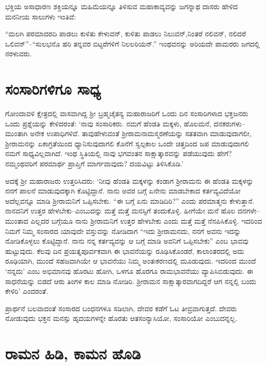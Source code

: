 ಭಕ್ತಿಯ ಅಸಾಧಾರಣ ಶಕ್ತಿಯನ್ನೂ ಮಹಿಮೆಯನ್ನೂ ತಿಳಿಸುವ ಮಹಾಕಾವ್ಯವನ್ನು ಜಗನ್ನಾಥ ದಾಸರು ಹೇಳಿದ ಮನನೀಯ ಸಾಲುಗಳು ಇಂತಿವೆ:

“ಮಲಗಿ ಪರಮಾದರದಿ ಪಾಡಲು ಕುಳಿತು ಕೇಳುವನ್, ಕುಳಿತು ಪಾಡಲು ನಿಲುವನ್,\break ನಿಂತರೆ ನಲಿವನ್, ನಲಿದರೆ ಒಲಿವನ್​”–“ಸುಲಭನೊ ಹರಿ ತನ್ನವರ ಬಿಟ್ಟರೆಗಳಿಗೆ ನಿಲಲರಿಯನ್.” ಇಂಥವನನ್ನು ಅರಿಯದೇ ಪಾಮರರು ಜಗದಲ್ಲಿ ನರಳುವರು.


\section*{ಸಂಸಾರಿಗಳಿಗೂ ಸಾಧ್ಯ}


ಗೋಂದಾವಳಿ ಕ್ಷೇತ್ರದಲ್ಲಿ ವಾಸವಾಗಿದ್ದ ಶ‍್ರೀ ಬ್ರಹ್ಮಚೈತನ್ಯ ಮಹಾರಾಜರಿಗೆ ಒಂದು ದಿನ ಸಂಸಾರಿಗಳಾದ ಭಕ್ತಜನರು ಒಂದು ಪ್ರಶ್ನೆಯನ್ನು ಕೇಳಿದರಂತೆ: ‘ನಾವು ಸಂಸಾರಿಕರು. ನಮಗೆ ಹೆಂಡತಿ ಮಕ್ಕಳು, ಹೊಲಮನೆ, ದನಕರುಗಳು–ಮುಂತಾಗಿ ಅನೇಕ ಉಪಾಧಿಗಳಿವೆ. ತಾವು\break ಹೇಳುವಂತೆ ಶ‍್ರೀರಾಮನಾಮಸ್ಮರಣೆಯನ್ನು ಸತತವಾಗಿ ಮಾಡುವು\-ದಾಗಲೀ, ಶ‍್ರೀರಾಮನನ್ನು ಏಕಾಗ್ರತೆಯಿಂದ ಧ್ಯಾನಿಸುವುದಾಗಲಿ ಕೊನೆಗೆ ಸ್ವಲ್ಪಕಾಲ ಒಂದೇ ಚಿತ್ತದಿಂದ ಜಪ ಮಾಡುವುದಾಗಲಿ ನಮಗೆ ಸಾಧ್ಯವಿಲ್ಲವಾಗಿದೆ. ಇಂಥ ಸ್ಥಿತಿಯಲ್ಲಿ ನಾವು ಭಗವಂತನ ಸಾಕ್ಷಾತ್ಕಾರವನ್ನು ಪಡೆಯುವುದು ಹೇಗೆ? ನಮ್ಮಂಥವರಿಗೆ ಪರಮಾರ್ಥ ಪ್ರಾಪ್ತಿಗೆ ಮಾರ್ಗವಾವುದು? ದಯವಿಟ್ಟು ತಿಳಿಸಿಕೊಡಿ.’

ಅದಕ್ಕೆ ಶ‍್ರೀ ಮಹಾರಾಜರು ಉತ್ತರಿಸಿದರು: ‘ನೀವು ಹೆಂಡತಿ ಮಕ್ಕಳನ್ನು ಕಂಡಾಗ ಶ‍್ರೀರಾಮನು ಈ ಹೆಂಡತಿ ಮಕ್ಕಳನ್ನು ನನಗೆ ಪಾಲನೆ ಮಾಡುವುದಕ್ಕಾಗಿ ಕೊಟ್ಟಿದ್ದಾನೆ. ನಾನು ಅವರ ಬಗ್ಗೆ ಏನೇನು ಮಾಡಬೇಕಾದ ಕರ್ತವ್ಯವಿದೆಯೋ ಅದೆಲ್ಲವನ್ನೂ ಮಾಡಿ ಶ‍್ರೀರಾಮನಿಗೆ ಒಪ್ಪಿಸಬೇಕು. “ಈ ಬಗ್ಗೆ ಏನು ಮಾಡಿದಿರಿ?” ಎಂದು ಪರಮಾತ್ಮನು ಕೇಳುತ್ತಾನೆ. ನಾನವನಿಗೆ ಉತ್ತರ ಹೇಳಬೇಕು–ಎಂಬುದನ್ನು ಮತ್ತೆ ಮತ್ತೆ ಮನಸ್ಸಿಗೆ ತಂದುಕೊಳ್ಳಿ. ಹೀಗೆಯೇ ಮನೆ ಹೊಲ ದನಗಳೇ–ಮುಂತಾದ ಎಲ್ಲದರ ಬಗ್ಗೆಯೂ ನಾನು ಶ‍್ರೀರಾಮನಿಗೆ ಉತ್ತರ ಹೇಳಬೇಕು ಎಂದು ಮತ್ತೆ ಮತ್ತೆ ನೆನಪಿಸಿಕೊಳ್ಳಿ. ಇದರಿಂದ ನಿಮಗೆ ನಿಮ್ಮ ಸಂಸಾರದ ಯಾವುದೇ ವಸ್ತುವನ್ನು ನೋಡಿದಾಗ “ಇದು ಶ‍್ರೀರಾಮನದು, ನನಗೆ ಅವನು ಇದನ್ನು ನೋಡಿಕೊಳ್ಳಲು ಕೊಟ್ಟಿದ್ದಾನೆ. ನಾನು ನನ್ನ ಕರ್ತವ್ಯವನ್ನು ಆ ಬಗ್ಗೆ ಮಾಡಿ ಅವನಿಗೆ ಒಪ್ಪಿಸಬೇಕು” ಎಂಬ ಭಾವವು ಹುಟ್ಟುವುದು. ಕೆಲವು ದಿನ ಪ್ರಯತ್ನಪೂರ್ವಕವಾಗಿ ಈ ಭಾವನೆಯನ್ನು ರೂಢಿಸಿಕೊಂಡರೆ, ಕಾಲಾಂತರದಲ್ಲಿ ಅದು ರೂಢಿಯಾಗಿ, ಮುಂದೆ ಸಹಜವಾಗಿಯೇ ಆ ಭಾವನೆಯು ನಿಮ್ಮ ಅಂತಃಕರಣದಲ್ಲಿ ಮೂಡುವುದು. ಇದರಿಂದ ಮುಂದೆ ‘ನನ್ನದು’ ಎಂಬ ಅಭಿಮಾನವು ಹೊರಟು ಹೋಗಿ, ಒಳಗೂ ಹೊರಗೂ ರಾಮಭಾವನೆಯು ವ್ಯಾಪಿಸಿಬಿಡುವುದು. ಈ ಸಾಧನೆಯನ್ನು ಬಿಡದೆ ಆರು ತಿಂಗಳ ಕಾಲ ಮಾಡಿ ನೋಡಿರಿ. ಶ‍್ರೀರಾಮನ ಸಾಕ್ಷಾತ್ಕಾರವಾಗದಿದ್ದರೆ ಆಗ ನನ್ನಲ್ಲಿ ಬಂದು ಕೇಳಿರಿ’ ಎಂದರಂತೆ.

ಪ್ರಾರ್ಥನೆ ಬಲವಾದಂತೆ ಸಂಸಾರದ ಬಂಧನಗಳೂ ಸಡಿಲಾಗಿ, ದೇವರ ಕಡೆಗೆ ಓಟ ತೀವ್ರವಾಗುತ್ತದೆ. ದೇವರು ನೋಡುವುದು ಭಕ್ತನ ಮನಸ್ಸು ಹೃದಯಗಳನ್ನೇ ಹೊರತು ಆತ\break ಸಂನ್ಯಾಸಿಯೋ, ಸಂಸಾರಿಯೋ ಎಂಬುದನ್ನಲ್ಲ.


\section*{ರಾಮನ ಹಿಡಿ, ಕಾಮನ ಹೊಡಿ}

